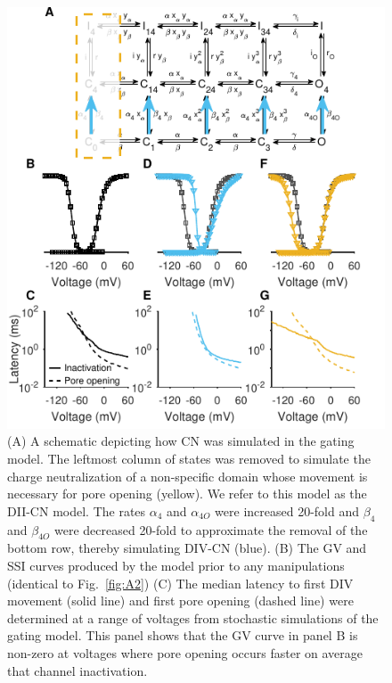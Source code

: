 \begin{figure}[t]
\begin{minipage}[c]{85mm}
    \includegraphics[width=\textwidth]{Figures/AppendixA/figure04.pdf}
\end{minipage}\hfill
\begin{minipage}[c]{80mm}
    \caption{
    (A) A schematic depicting how CN was simulated in the gating model. The leftmost column of states was removed to simulate the charge neutralization of a non-specific domain whose movement is necessary for pore opening (yellow). We refer to this model as the DII-CN model. The rates $\alpha_4$ and $\alpha_{4O}$ were increased 20-fold and $\beta_4$ and $\beta_{4O}$ were decreased 20-fold to approximate the removal of the bottom row, thereby simulating DIV-CN (blue).
    (B) The GV and SSI curves produced by the model prior to any manipulations (identical to Fig.~\ref{fig:A2})
    (C) The median latency to first DIV movement (solid line) and first pore opening (dashed line) were determined at a range of voltages from stochastic simulations of the gating model. This panel shows that the GV curve in panel B is non-zero at voltages where pore opening occurs faster on average that channel inactivation.
}
\end{minipage}
\end{figure}
